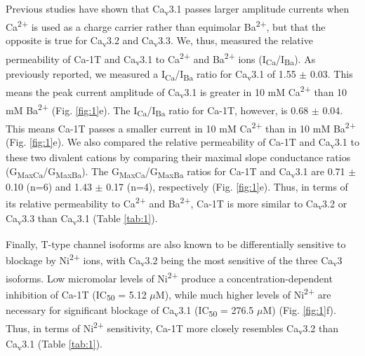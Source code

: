 Previous studies have shown that Ca\textsubscript{v}3.1 passes larger amplitude currents when Ca\textsuperscript{2+} is used as a charge carrier rather than equimolar Ba\textsuperscript{2+}, but that the opposite is true for Ca\textsubscript{v}3.2 and Ca\textsubscript{v}3.3\cite{mcrory:2000aa,shcheglovitov:2007aa}.
We, thus, measured the relative permeability of Ca-\alpha1T and Ca\textsubscript{v}3.1 to Ca\textsuperscript{2+} and Ba\textsuperscript{2+} ions (I\textsubscript{Ca}/I\textsubscript{Ba}).
As previously reported, we measured a I\textsubscript{Ca}/I\textsubscript{Ba} ratio for Ca\textsubscript{v}3.1 of 1.55 $\pm$ 0.03. This means the peak current amplitude of Ca\textsubscript{v}3.1 is greater in 10 mM Ca\textsuperscript{2+} than 10 mM Ba\textsuperscript{2+} (Fig. \ref{fig:1}e).
The I\textsubscript{Ca}/I\textsubscript{Ba} ratio for Ca-\alpha1T, however, is 0.68 $\pm$ 0.04. This means Ca-\alpha1T passes a smaller current in 10 mM Ca\textsuperscript{2+} than in 10 mM Ba\textsuperscript{2+} (Fig. \ref{fig:1}e).
We also compared the relative permeability of Ca-\alpha1T and Ca\textsubscript{v}3.1 to these two divalent cations by comparing their maximal slope conductance ratios (G\textsubscript{MaxCa}/G\textsubscript{MaxBa}).
The G\textsubscript{MaxCa}/G\textsubscript{MaxBa} ratios for Ca-\alpha1T and Ca\textsubscript{v}3.1 are 0.71 $\pm$ 0.10 (n=6) and 1.43 $\pm$ 0.17 (n=4), respectively (Fig. \ref{fig:1}e).
Thus, in terms of its relative permeability to Ca\textsuperscript{2+} and Ba\textsuperscript{2+}, Ca-\alpha1T is more similar to Ca\textsubscript{v}3.2 or Ca\textsubscript{v}3.3 than Ca\textsubscript{v}3.1 (Table \ref{tab:1}).

Finally, T-type channel isoforms are also known to be differentially sensitive to blockage by Ni\textsuperscript{2+} ions, with Ca\textsubscript{v}3.2 being the most sensitive of the three Ca\textsubscript{v}3 isoforms\cite{lee:1999ab}.
Low micromolar levels of Ni\textsuperscript{2+} produce a concentration-dependent inhibition of Ca-\alpha1T (IC\textsubscript{50} = 5.12 $\mu$M), while much higher levels of Ni\textsuperscript{2+} are necessary for significant blockage of Ca\textsubscript{v}3.1 (IC\textsubscript{50} = 276.5 $\mu$M) (Fig. \ref{fig:1}f).
Thus, in terms of Ni\textsuperscript{2+} sensitivity, Ca-\alpha1T more closely resembles Ca\textsubscript{v}3.2 than Ca\textsubscript{v}3.1 (Table \ref{tab:1}).
